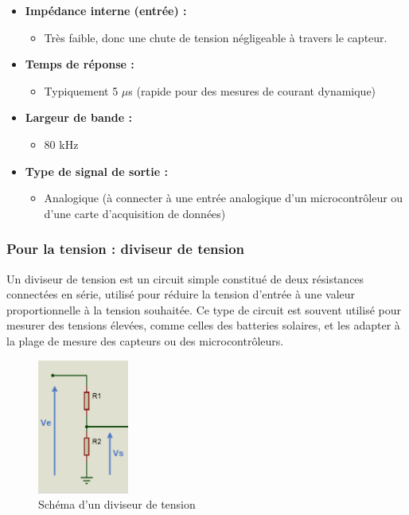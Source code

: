 \begin{itemize}
	\item \textbf{Impédance interne (entrée) :}
	\begin{itemize}
		\item Très faible, donc une chute de tension négligeable à travers le capteur.
	\end{itemize}
	
	\item \textbf{Temps de réponse :}
	\begin{itemize}
		\item Typiquement 5 $\mu$s (rapide pour des mesures de courant dynamique)
	\end{itemize}
	
	\item \textbf{Largeur de bande :}
	\begin{itemize}
		\item 80 kHz
	\end{itemize}
	
	\item \textbf{Type de signal de sortie :}
	\begin{itemize}
		\item Analogique (à connecter à une entrée analogique d'un microcontrôleur ou d'une carte d'acquisition de données)
	\end{itemize}
\end{itemize}


\subsubsection*{Pour la tension : diviseur de tension}

Un diviseur de tension est un circuit simple constitué de deux résistances connectées en série, utilisé pour réduire la tension d'entrée à une valeur proportionnelle à la tension souhaitée. Ce type de circuit est souvent utilisé pour mesurer des tensions élevées, comme celles des batteries solaires, et les adapter à la plage de mesure des capteurs ou des microcontrôleurs.

\begin{figure}[H]
	\centering
	\includegraphics[width=3cm]{./img/composants/DDT.png}
	\caption{Schéma d'un diviseur de tension }
	\label{i1}
\end{figure}



